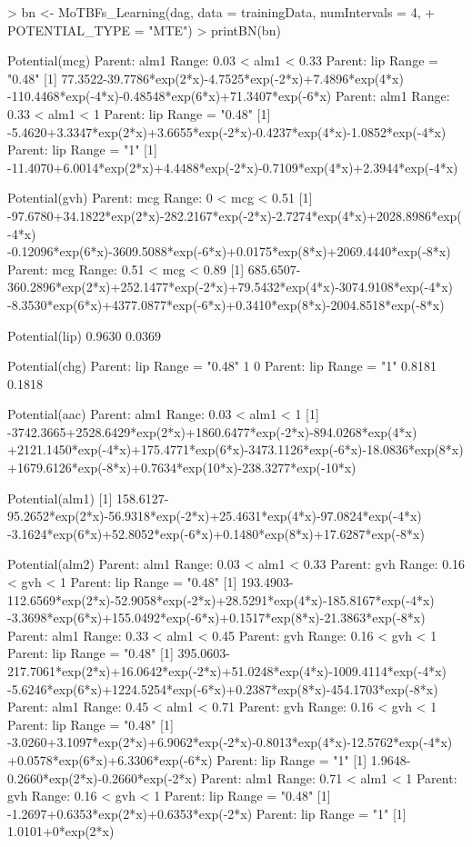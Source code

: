 \begin{example}
> bn <- MoTBFs_Learning(dag, data = trainingData, numIntervals = 4,
+        POTENTIAL_TYPE = "MTE")
> printBN(bn)

Potential(mcg)
Parent: alm1    	 Range: 0.03 < alm1 < 0.33 
Parent: lip    	 Range = "0.48" 
[1] 77.3522-39.7786*exp(2*x)-4.7525*exp(-2*x)+7.4896*exp(4*x)
-110.4468*exp(-4*x)-0.48548*exp(6*x)+71.3407*exp(-6*x)
Parent: alm1    	 Range: 0.33 < alm1 < 1 
Parent: lip    	 Range = "0.48" 
[1] -5.4620+3.3347*exp(2*x)+3.6655*exp(-2*x)-0.4237*exp(4*x)-1.0852*exp(-4*x)
Parent: lip    	 Range = "1" 
[1] -11.4070+6.0014*exp(2*x)+4.4488*exp(-2*x)-0.7109*exp(4*x)+2.3944*exp(-4*x)

Potential(gvh)
Parent: mcg    	 Range: 0 < mcg < 0.51 
[1] -97.6780+34.1822*exp(2*x)-282.2167*exp(-2*x)-2.7274*exp(4*x)+2028.8986*exp(-4*x)
-0.12096*exp(6*x)-3609.5088*exp(-6*x)+0.0175*exp(8*x)+2069.4440*exp(-8*x)
Parent: mcg    	 Range: 0.51 < mcg < 0.89 
[1] 685.6507-360.2896*exp(2*x)+252.1477*exp(-2*x)+79.5432*exp(4*x)-3074.9108*exp(-4*x)
-8.3530*exp(6*x)+4377.0877*exp(-6*x)+0.3410*exp(8*x)-2004.8518*exp(-8*x)

Potential(lip)
0.9630 0.0369


Potential(chg)
Parent: lip    	 Range = "0.48" 
1 0 
Parent: lip    	 Range = "1" 
0.8181 0.1818 


Potential(aac)
Parent: alm1    	 Range: 0.03 < alm1 < 1 
[1] -3742.3665+2528.6429*exp(2*x)+1860.6477*exp(-2*x)-894.0268*exp(4*x)
+2121.1450*exp(-4*x)+175.4771*exp(6*x)-3473.1126*exp(-6*x)-18.0836*exp(8*x)
+1679.6126*exp(-8*x)+0.7634*exp(10*x)-238.3277*exp(-10*x)

Potential(alm1)
[1] 158.6127-95.2652*exp(2*x)-56.9318*exp(-2*x)+25.4631*exp(4*x)-97.0824*exp(-4*x)
-3.1624*exp(6*x)+52.8052*exp(-6*x)+0.1480*exp(8*x)+17.6287*exp(-8*x)

Potential(alm2)
Parent: alm1    	 Range: 0.03 < alm1 < 0.33 
Parent: gvh    	 Range: 0.16 < gvh < 1 
Parent: lip    	 Range = "0.48" 
[1] 193.4903-112.6569*exp(2*x)-52.9058*exp(-2*x)+28.5291*exp(4*x)-185.8167*exp(-4*x)
-3.3698*exp(6*x)+155.0492*exp(-6*x)+0.1517*exp(8*x)-21.3863*exp(-8*x)
Parent: alm1    	 Range: 0.33 < alm1 < 0.45 
Parent: gvh    	 Range: 0.16 < gvh < 1 
Parent: lip    	 Range = "0.48" 
[1] 395.0603-217.7061*exp(2*x)+16.0642*exp(-2*x)+51.0248*exp(4*x)-1009.4114*exp(-4*x)
-5.6246*exp(6*x)+1224.5254*exp(-6*x)+0.2387*exp(8*x)-454.1703*exp(-8*x)
Parent: alm1    	 Range: 0.45 < alm1 < 0.71 
Parent: gvh    	 Range: 0.16 < gvh < 1 
Parent: lip    	 Range = "0.48" 
[1] -3.0260+3.1097*exp(2*x)+6.9062*exp(-2*x)-0.8013*exp(4*x)-12.5762*exp(-4*x)
+0.0578*exp(6*x)+6.3306*exp(-6*x)
Parent: lip    	 Range = "1" 
[1] 1.9648-0.2660*exp(2*x)-0.2660*exp(-2*x)
Parent: alm1    	 Range: 0.71 < alm1 < 1 
Parent: gvh    	 Range: 0.16 < gvh < 1 
Parent: lip    	 Range = "0.48" 
[1] -1.2697+0.6353*exp(2*x)+0.6353*exp(-2*x)
Parent: lip    	 Range = "1" 
[1] 1.0101+0*exp(2*x)
\end{example}

